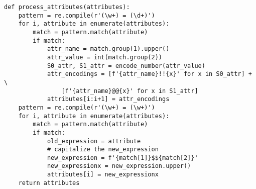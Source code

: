 \begin{lstlisting}[style=mystyle, caption={Function for modifying attributes for range comparison}, label=yourlabel]
def process_attributes(attributes):
    pattern = re.compile(r'(\w+) = (\d+)')
    for i, attribute in enumerate(attributes):
        match = pattern.match(attribute)
        if match:
            attr_name = match.group(1).upper()
            attr_value = int(match.group(2))
            S0_attr, S1_attr = encode_number(attr_value)
            attr_encodings = [f'{attr_name}!!{x}' for x in S0_attr] + \
                [f'{attr_name}@@{x}' for x in S1_attr]
            attributes[i:i+1] = attr_encodings
    pattern = re.compile(r'(\w+) = (\w+)')
    for i, attribute in enumerate(attributes):
        match = pattern.match(attribute)
        if match:
            old_expression = attribute
            # capitalize the new_expression
            new_expression = f'{match[1]}$${match[2]}'
            new_expressionx = new_expression.upper()
            attributes[i] = new_expressionx
    return attributes


\end{lstlisting}
